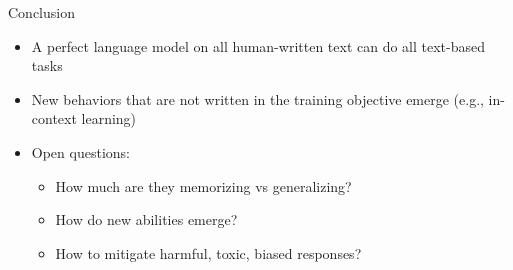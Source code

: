 \documentclass[usenames,dvipsnames,notes,11pt,aspectratio=169,hyperref={colorlinks=true, linkcolor=blue}]{beamer}
\begin{document}
\begin{frame}
    {Conclusion}
    \begin{itemize}
        \item A perfect language model on all human-written text can do all text-based tasks
        \item New behaviors that are not written in the training objective emerge (e.g., in-context learning)
        \item Open questions:
            \begin{itemize}
                \item How much are they memorizing vs generalizing?
                \item How do new abilities emerge?
                \item How to mitigate harmful, toxic, biased responses?
            \end{itemize}
    \end{itemize}
\end{frame}
\end{document}
